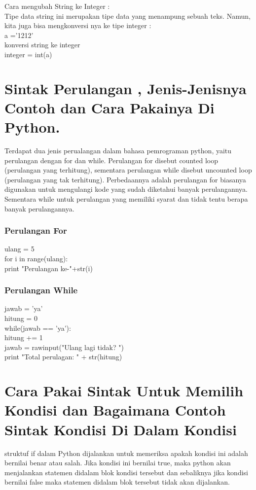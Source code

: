 Cara mengubah String ke Integer :\\
Tipe data string ini merupakan tipe data yang menampung sebuah teks. Namun, kita juga bisa mengkonversi nya ke tipe integer :\\
a ='1212'\\
konversi string ke integer\\
integer = int(a) \\
\section{Sintak Perulangan , Jenis-Jenisnya Contoh dan Cara Pakainya Di Python.}
Terdapat dua jenis perualangan dalam bahasa pemrograman python, yaitu perulangan dengan for dan while. Perulangan for disebut counted loop (perulangan yang terhitung), sementara perulangan while disebut uncounted loop (perulangan yang tak terhitung). Perbedaannya adalah perulangan for biasanya digunakan untuk mengulangi kode yang sudah diketahui banyak perulangannya. Sementara while untuk perulangan yang memiliki syarat dan tidak tentu berapa banyak perulangannya.\\
\subsubsection{Perulangan For}
ulang = 5\\
for i in range(ulang):\\
	print "Perulangan ke-"+str(i)
\subsubsection{Perulangan While}

jawab = 'ya'\\
hitung = 0\\

while(jawab == 'ya'):\\
    hitung += 1\\
    jawab = rawinput("Ulang lagi tidak? ")\\    
print "Total perulagan: " + str(hitung)
\section{Cara Pakai Sintak Untuk Memilih Kondisi dan Bagaimana Contoh Sintak Kondisi Di Dalam Kondisi}
struktuf if dalam Python dijalankan untuk memeriksa apakah kondisi ini adalah bernilai benar atau salah. Jika kondisi ini bernilai true, maka python akan menjalankan statemen didalam blok kondisi tersebut dan sebaliknya jika kondisi bernilai false maka statemen didalam blok tersebut tidak akan dijalankan. 
